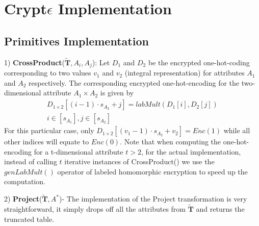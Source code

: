 \section{Crypt$\epsilon$ Implementation }
\subsection{\system Primitives Implementation}
1) \textbf{\textsf{CrossProduct}}($\tilde{\mathbf{T}}, A_i, A_j$): Let $D_1$ and $D_2$  be the encrypted one-hot-coding corresponding to two  values $v_1$ and $v_2$ (integral representation) for attributes $A_1$ and $A_2$ respectively. The corresponding encrypted one-hot-encoding for the two-dimensional attribute $A_1\times A_2$ is given by  \begin{gather} D_{1\times 2}[(i-1)\cdot s_{A_2}+j] = labMult(D_1[i], D_2[j])\\ i \in [s_{A_1}], j \in [s_{A_2}]\end{gather} For this particular case, only $D_{1 \times 2}[(v_1-1)\cdot s_{A_2}+v_2]=Enc(1)$ while all other indices will equate to $Enc(0)$. Note that when computing the one-hot-encoding for a t-dimensional attribute $t > 2$,  for the actual implementation, instead of calling $t$ iterative instances of \textsf{CrossProduct}() we use the $genLabMult()$ operator of labeled homomorphic encryption to speed up the computation. 

2) \textbf{\textsf{Project}}($\tilde{\mathbf{T}}, A^*$)- The implementation of the \textsf{Project} transformation is very straightforward, it simply drops off all the attributes from $\tilde{\mathbf{T}}$ and returns the truncated table.

